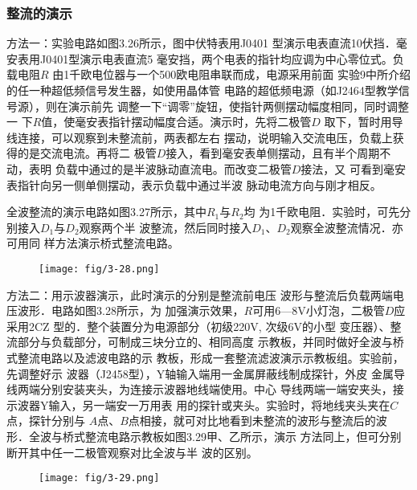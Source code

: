 \subsubsection{整流的演示}
方法一：实验电路如图3.26所示，图中伏特表用J0401
型演示电表直流10伏挡．毫安表用J0401型演示电表直流5
毫安挡，两个电表的指针均应调为中心零位式。负载电阻$R$
由1千欧电位器与一个500欧电阻串联而成，电源采用前面
实验9中所介绍的任一种超低频信号发生器，如使用晶体管
电路的超低频电源（如J2464型教学信号源），则在演示前先
调整一下“调零”旋钮，使指针两侧摆动幅度相同，同时调整一
下$R$值，使毫安表指针摆动幅度合适。演示时，先将二极管$D$
取下，暂时用导线连接，可以观察到未整流前，两表都左右
摆动，说明输入交流电压，负载上获得的是交流电流。再将二
极管$D$接入，看到毫安表单侧摆动，且有半个周期不动，表明
负载中通过的是半波脉动直流电。而改变二极管$D$接法，又
可看到毫安表指针向另一侧单侧摆动，表示负载中通过半波
脉动电流方向与刚才相反。

全波整流的演示电路如图3.27所示，其中$R_1$与$R_2$均
为1千欧电阻．实验时，可先分别接入$D_1$与$D_2$观察两个半
波整流，然后同时接入$D_1$、$D_2$观察全波整流情况．亦可用同
样方法演示桥式整流电路。

\begin{figure}[htp]
    \centering
\texttt{[image: fig/3-28.png]}
    \caption{}
\end{figure}

方法二：用示波器演示，此时演示的分别是整流前电压
波形与整流后负载两端电压波形．电路如图3.28所示，为
加强演示效果，$R$可用6—8V小灯泡，二极管$D$应采用2CZ
型的．整个装置分为电源部分（初级220V, 次级6V的小型
变压器）、整流部分与负载部分，可制成三块分立的、相同高度
示教板，并同时做好全波与桥式整流电路以及滤波电路的示
教板，形成一套整流滤波演示示教板组。实验前，先调整好示
波器（J2458型），Y轴输入端用一金属屏蔽线制成探针，外皮
金属导线两端分别安装夹头，为连接示波器地线端使用。中心
导线两端一端安夹头，接示波器Y输入，另一端安一万用表
用的探针或夹头。实验时，将地线夹头夹在$C$点，探针分别与
$A$点、$B$点相接，就可对比地看到未整流的波形与整流后的波
形．全波与桥式整流电路示教板如图3.29甲、乙所示，演示
方法同上，但可分别断开其中任一二极管观察对比全波与半
波的区别。

\begin{figure}[htp]
    \centering
\texttt{[image: fig/3-29.png]}
    \caption{}
\end{figure}

